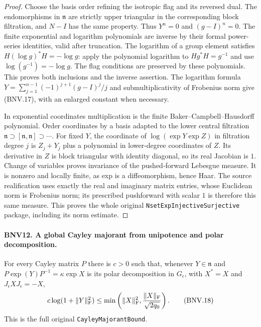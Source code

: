 \begin{proof}
Choose the basis order refining the isotropic flag and its reversed dual.
The endomorphisms in $\mathfrak n$ are strictly upper triangular in the
corresponding block filtration, and $N-I$ has the same property.  Thus
$Y^n=0$ and $(g-I)^n=0$.  The finite exponential and logarithm polynomials
are inverse by their formal power-series identities, valid after truncation.
The logarithm of a group element satisfies $H(\log g)^*H=-\log g$:
apply the polynomial logarithm to $Hg^*H=g^{-1}$ and use
$\log(g^{-1})=-\log g$.  The flag conditions are preserved by these
polynomials.  This proves both inclusions and the inverse assertion.
The logarithm formula
$Y=\sum_{j=1}^{n-1}(-1)^{j+1}(g-I)^j/j$
and submultiplicativity of Frobenius norm give (BNV.17), with an enlarged
constant when necessary.

In exponential coordinates multiplication is the finite
Baker--Campbell--Hausdorff polynomial.  Order coordinates by a basis
adapted to the lower central filtration
$\mathfrak n\supset[\mathfrak n,\mathfrak n]\supset\cdots$.
For fixed $Y$, the coordinate of $\log(\exp Y\exp Z)$ in filtration
degree $j$ is $Z_j+Y_j$ plus a polynomial in lower-degree coordinates
of $Z$.  Its derivative in $Z$ is block triangular with identity diagonal,
so its real Jacobian is $1$.  Change of variables proves invariance of
the pushed-forward Lebesgue measure.  It is nonzero and locally finite,
as exp is a diffeomorphism, hence Haar.  The source realification uses
exactly the real and imaginary matrix entries, whose Euclidean norm is
Frobenius norm; its prescribed pushforward with scalar $1$ is therefore
this same measure.  This proves the whole original
\texttt{NsetExpInjectiveSurjective} package, including its norm estimate.
\end{proof}

\paragraph{BNV12. A global Cayley majorant from unipotence and polar decomposition.}
\label{claim:BNV12}
For every Cayley matrix $P$ there is $c>0$ such that, whenever
$Y\in\mathfrak n$ and $P\exp(Y)P^{-1}=\kappa\exp X$ is its polar
decomposition in $G_\epsilon$, with $X^*=X$ and $J_\epsilon XJ_\epsilon=-X$,
\[
 c\log(1+\|Y\|_{\rm F}^2)
 \le\min\left(\|X\|_{\rm F}^2,
                  \frac{\|X\|_{\rm F}}{\sqrt{2q_0}}\right).
 \tag{BNV.18}
\]
This is the full original \texttt{CayleyMajorantBound}.

